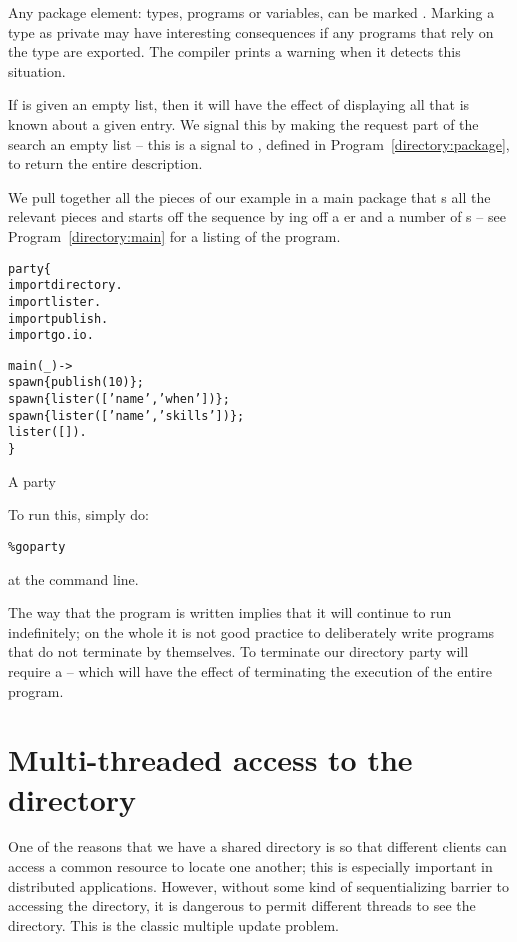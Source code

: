 \begin{aside}
Any package element: types, programs or variables, can be marked . Marking a type as private may have interesting consequences if any programs that rely on the type are exported. The compiler prints a warning when it detects this situation.
\end{aside}

\noindent
If  is given an empty list, then it will have the effect of displaying all that is known about a given entry.  We signal this by making the request part of the search an empty list -- this is a signal to , defined in Program~\vref{directory:package}, to return the entire description.

We pull together all the pieces of our example in a main package that s all the relevant pieces and starts off the sequence by ing off a er and a number of s -- see Program~\vref{directory:main} for a listing of the program.
\begin{program}[tb]
\vspace{0.5ex}
\begin{alltt}
party\{
  import directory.
  import lister.
  import publish.
  import go.io.
  
  main(_) ->
    spawn\{ publish(10) \};
    spawn\{ lister(['name','when']) \};
    spawn\{ lister(['name','skills']) \};
    lister([]).
\}
\end{alltt}
\vspace{-2ex}
\caption{A  party}
\label{directory:main}
\end{program}
To run this, simply do:
\begin{alltt}
\% go party
\end{alltt}
at the command line.

The way that the  program is written implies that it will continue to run indefinitely; on the whole it is not good practice to deliberately write programs that do not terminate by themselves. To terminate our directory party will require a  -- which will have the effect of terminating the execution of the entire \go program.

\section{Multi-threaded access to the directory}
One of the reasons that we have a shared directory is so that different clients can access a common resource to locate one another; this is especially important in distributed applications. However, without some kind of sequentializing barrier to accessing the directory, it is dangerous to permit different threads to see the directory. This is the classic multiple update problem.


